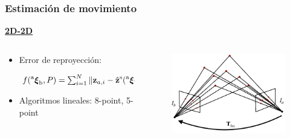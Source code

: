 \begin{frame}
    \frametitle{Estimación de movimiento}
    \scriptsize
    
    \underline{\textbf{2D-2D}}
    
    \begin{columns}
    \begin{column}{0.7\textwidth}
        \begin{itemize}
        \item Error de reproyección:
        \begin{center}
            $f(\prescript{\mathrm{a}}{}{{\boldsymbol{\mathbf{\xi}}}_\mathrm{b}}, P)= \sum_{i=1}^{N} \Vert \boldsymbol{\mathbf{z}}_{a,i} - \hat{\boldsymbol{\mathbf{z}}}^{\mathrm{s}}(\prescript{\mathrm{a}}{}{{\boldsymbol{\mathbf{\xi}}}_\mathrm{\mathrm{W}}},\prescript{\mathrm{\mathrm{W}}}{}{\boldsymbol{\mathbf{p}}}_{i}) \Vert^{2} + \Vert \boldsymbol{\mathbf{z}}_{b,i} - \hat{\boldsymbol{\mathbf{z}}}^{\mathrm{s}}({\prescript{\mathrm{a}}{}{{\boldsymbol{\mathbf{\xi}}}_\mathrm{b}}}^{-1}\prescript{\mathrm{a}}{}{{\boldsymbol{\mathbf{\xi}}}_\mathrm{\mathrm{W}}},\prescript{\mathrm{\mathrm{W}}}{}{\boldsymbol{\mathbf{p}}}_{i}) \Vert^{2}$
        \end{center}
        \item Algoritmos lineales: 8-point, 5-point
        \end{itemize}
    \end{column}
    \begin{column}{0.3\textwidth}
        \begin{figure}
            \includegraphics[width=0.5\columnwidth]{./images/localization_2d_2d.pdf}
        \end{figure}
    \end{column}
    \end{columns}


\end{frame}
